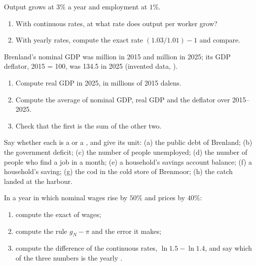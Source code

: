 \begin{exercise}[$\star$]\label{exo:b1:models-and-data:per-worker}
Output grows at $3\%$ a year and employment at $1\%$.
\begin{enumerate}
  \item With continuous rates, at what rate does output per worker grow?
  \item With yearly rates, compute the exact rate $(1.03/1.01) - 1$ and compare.
\end{enumerate}
\end{exercise}

\begin{exercise}[$\star$]\label{exo:b1:models-and-data:brenland}
Brenland's nominal GDP was  million in 2015 and 
million in 2025; its GDP deflator, 2015 = 100, was 134.5 in 2025
(invented data, ).
\begin{enumerate}
  \item Compute real GDP in 2025, in millions of 2015 dalens.
  \item Compute the average  of nominal GDP, real GDP and the deflator over 2015--2025.
  \item Check that the first is the sum of the other two.
\end{enumerate}
\end{exercise}

\begin{exercise}[$\star$]\label{exo:b1:models-and-data:stock-or-flow}
Say whether each is a  or a , and give its unit: (a) the public
debt of Brenland; (b) the government deficit; (c) the number of people
unemployed; (d) the number of people who find a job in a month; (e) a
household's savings account balance; (f) a household's saving; (g) the
cod in the cold store of Brenmoor; (h) the catch landed at the harbour.
\end{exercise}

\begin{exercise}[$\star\star$]\label{exo:b1:models-and-data:high-inflation}
In a year in which nominal wages rise by $50\%$ and prices by $40\%$:
\begin{enumerate}
  \item compute the exact  of wages;
  \item compute the rule $g_N - \pi$ and the error it makes;
  \item compute the difference of the continuous rates, $\ln 1.5 - \ln 1.4$, and say which of the three numbers is the yearly .
\end{enumerate}
\end{exercise}


